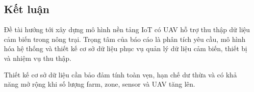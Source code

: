 
\subsection{Kết luận}
Đề tài hướng tới xây dựng mô hình nền tảng IoT có UAV hỗ trợ thu thập dữ liệu cảm biến trong nông trại. Trọng tâm của báo cáo là phân tích yêu cầu, mô hình hóa hệ thống và thiết kế cơ sở dữ liệu phục vụ quản lý dữ liệu cảm biến, thiết bị và nhiệm vụ thu thập.

Thiết kế cơ sở dữ liệu cần bảo đảm tính toàn vẹn, hạn chế dư thừa và có khả năng mở rộng khi số lượng farm, zone, sensor và UAV tăng lên.


